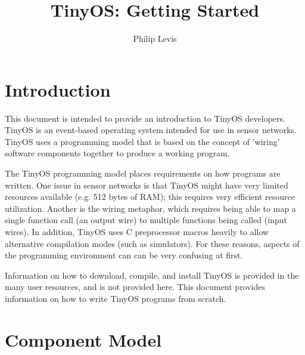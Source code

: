 \documentclass[12pt]{article}
\begin{document}
\fontsize{10}{10}                               %

\title{TinyOS: Getting Started}
\author{Philip Levis}
\maketitle

\fontsize{10}{10}                               %

\section*{Introduction}

This document is intended to provide an introduction to TinyOS
developers. TinyOS is an event-based operating system intended for use
in sensor networks. TinyOS uses a programming model that is based on
the concept of 'wiring' software components together to produce a
working program.

The TinyOS programming model places requirements on how programs are
written. One issue in sensor networks is that TinyOS might have very
limited resources available (e.g. 512 bytes of RAM); this requires
very efficient resource utilization. Another is the wiring metaphor,
which requires being able to map a single function call (an output
wire) to multiple functions being called (input wires). In addition,
TinyOS uses C preprocessor macros heavily to allow alternative
compilation modes (such as simulators). For these reasons, aspects of
the programming environment can can be very confusing at first.

Information on how to download, compile, and install TinyOS is
provided in the many user resources, and is not provided here. This
document provides information on how to write TinyOS programs from
scratch.

\section*{Component Model}
\end{document}
